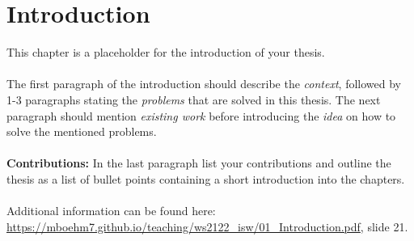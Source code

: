 \chapter{Introduction\label{cha:chapter1}}
This chapter is a placeholder for the introduction of your thesis. 
\\
\\
\noindent
The first paragraph of the introduction should describe the \emph{context}, followed by 1-3 paragraphs stating the \emph{problems} that are solved in this thesis.
The next paragraph should mention \emph{existing work} before introducing the \emph{idea} on how to solve the mentioned problems.\\
\\
\textbf{Contributions:}
In the last paragraph list your contributions and outline the thesis as a list of bullet points containing a short introduction into the chapters. 
\\
\\
\noindent 
Additional information can be found here: \url{https://mboehm7.github.io/teaching/ws2122_isw/01_Introduction.pdf}, slide 21.
